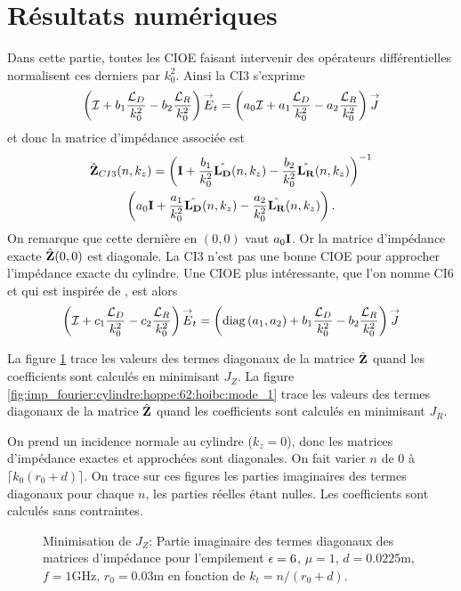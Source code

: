 \section{Résultats numériques}

  Dans cette partie, toutes les CIOE faisant intervenir des opérateurs différentielles normalisent ces derniers par \(k_0^2\). Ainsi la CI3 s'exprime  
  \begin{equation*}
    \left({\mathcal{I}} + b_1\dfrac{{\mathcal{L}_D}}{k_0^2} -b_2\dfrac{{\mathcal{L}_R}}{k_0^2}\right){\overset{\rightarrow}{E}}_t = \left(a_0{\mathcal{I}} + a_1\dfrac{{\mathcal{L}_D}}{k_0^2} - a_2 \dfrac{{\mathcal{L}_R}}{k_0^2} \right){\overset{\rightarrow}{J}}
  \end{equation*}
  et donc la matrice d'impédance associée est
  \begin{multline*}
    \hat{\mathbf{Z}}_{CI3}(n,k_z) = \left(\mathbf{I} + \dfrac{b_1}{k_0^2}\hat{\mathbf{L_D}}(n,k_z)- \dfrac{b_2}{k_0^2}\hat{\mathbf{L_R}}(n,k_z)\right)^{-1}
    \\
    \left(a_0\mathbf{I} + \dfrac{a_1}{k_0^2}\hat{\mathbf{L_D}}(n,k_z)- \dfrac{a_2}{k_0^2}\hat{\mathbf{L_R}}(n,k_z)\right).
  \end{multline*}
  On remarque que cette dernière en \((0,0)\) vaut \(a_0\mathbf{I}\). Or la matrice d'impédance exacte \(\hat{\mathbf{Z}}(0,0)\) est diagonale. La CI3 n'est pas une bonne CIOE pour approcher l'impédance exacte du cylindre.
  Une CIOE plus intéressante, que l'on nomme CI6 et qui est inspirée de \cite[p.~60]{hoppe_impedance_1995}, est alors
  \begin{equation*}
    \left({\mathcal{I}} + c_1\dfrac{{\mathcal{L}_D}}{k_0^2} -c_2\dfrac{{\mathcal{L}_R}}{k_0^2}\right){\overset{\rightarrow}{E}}_t = \left(\operatorname{diag}\left(a_1,a_2\right) + b_1\dfrac{{\mathcal{L}_D}}{k_0^2} - b_2 \dfrac{{\mathcal{L}_R}}{k_0^2} \right){\overset{\rightarrow}{J}}
  \end{equation*}

  La figure \ref{fig:imp_fourier:cylindre:hoppe:62:hoibc:mode_2} trace les valeurs des termes diagonaux de la matrice \(\hat{\mathbf{Z}}\) quand les coefficients sont calculés en minimisant \(J_Z\).
  La figure \ref{fig:imp_fourier:cylindre:hoppe:62:hoibc:mode_1} trace les valeurs des termes diagonaux de la matrice \(\hat{\mathbf{Z}}\) quand les coefficients sont calculés en minimisant \(J_R\).

  On prend un incidence normale au cylindre (\(k_z=0\)), donc les matrices d'impédance exactes et approchées sont diagonales. On fait varier \(n\) de 0 à \(\lceil k_0 (r_0+d) \rceil\). On trace sur ces figures les parties imaginaires des termes diagonaux pour chaque \(n\), les parties réelles étant nulles. Les coefficients sont calculés sans contraintes.

  \begin{figure}[!hbt]
    \centering
    
    \caption[CIOE sur empilement de Hoppe & Rahmat-Samii p.~62]{Minimisation de \(J_Z\): Partie imaginaire des termes diagonaux des matrices d'impédance pour l'empilement \(\epsilon = 6\), \(\mu = 1\), \(d=0.0225\text{m}\), \(f=1\text{GHz}\), \(r_0=0.03\text{m}\) en fonction de \(k_t = n / (r_0+d)\).}
    \label{fig:imp_fourier:cylindre:hoppe:62:hoibc:mode_2}
  \end{figure}

